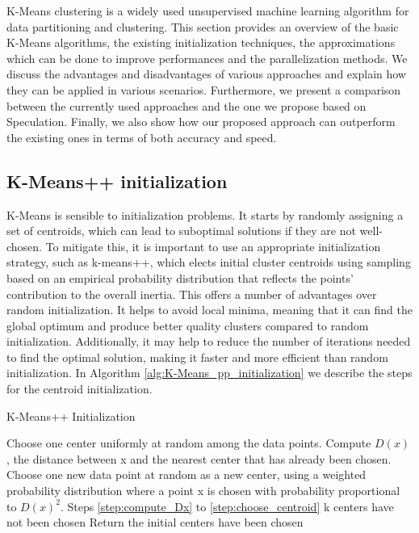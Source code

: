 \label{section:related_work}

K-Means clustering is a widely used unsupervised machine learning algorithm for data partitioning and clustering. This section provides an overview of the basic K-Means algorithms, the existing initialization techniques, the approximations which can be done to improve performances and the parallelization methods. We discuss the advantages and disadvantages of various approaches and explain how they can be applied in various scenarios. Furthermore, we present a comparison between the currently used approaches and the one we propose based on Speculation. Finally, we also show how our proposed approach can outperform the existing ones in terms of both accuracy and speed.
\subsection{K-Means++ initialization}
\label{section:K-Means_pp}

K-Means is sensible to initialization problems. It starts by randomly assigning a set of centroids, which can lead to suboptimal solutions if they are not well-chosen. To mitigate this, it is important to use an appropriate initialization strategy, such as k-means++, which elects initial cluster centroids using sampling based on an empirical probability distribution that reflects the points' contribution to the overall inertia. This offers a number of advantages over random initialization. It helps to avoid local minima, meaning that it can find the global optimum and produce better quality clusters compared to random initialization. Additionally, it may help to reduce the number of iterations needed to find the optimal solution, making it faster and more efficient than random initialization.
In Algorithm \ref{alg:K-Means_pp_initialization} we describe the steps for the centroid initialization.
\begin{algorithm}[H]
  \caption{K-Means++ Initialization}
  \label{alg:K-Means_pp_initialization}
  \begin{algorithmic}[1]
    \State Choose one center uniformly at random among the data points.
        \label{step:compute_Dx}
        \State Compute $D(x)$, the distance between x and the nearest center that has already been chosen.
    \EndFor
    \State Choose one new data point at random as a new center, using a weighted probability distribution where a point x is chosen with probability proportional to $D(x)^2$.
    \label{step:choose_centroid}
    \Repeat
        \State Steps \ref{step:compute_Dx} to \ref{step:choose_centroid}
    \Until k centers have not been chosen
    \State Return the initial centers have been chosen
  \end{algorithmic}
\end{algorithm}

